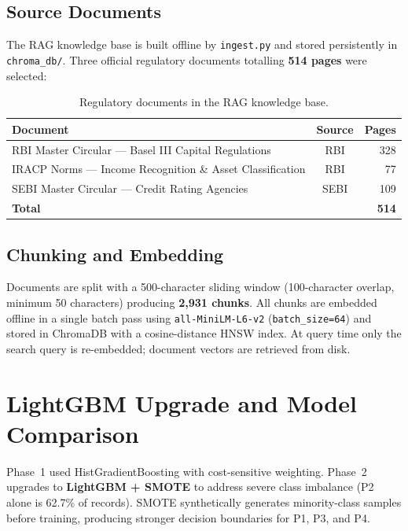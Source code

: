 \documentclass[11pt,a4paper]{article}
\begin{document}
\subsection{Source Documents}

The RAG knowledge base is built offline by \texttt{ingest.py} and stored persistently in \texttt{chroma\_db/}. Three official regulatory documents totalling \textbf{514 pages} were selected:

\begin{table}[h!]
    \centering
    \small
    \renewcommand{\arraystretch}{1.45}
    \begin{tabularx}{\textwidth}{@{} X c r @{}}
        \toprule
        \textbf{Document} & \textbf{Source} & \textbf{Pages} \\
        \midrule
        RBI Master Circular --- Basel III Capital Regulations     & RBI  & 328 \\
        IRACP Norms --- Income Recognition \& Asset Classification & RBI  & 77  \\
        SEBI Master Circular --- Credit Rating Agencies           & SEBI & 109 \\
        \midrule
        \textbf{Total} & & \textbf{514} \\
        \bottomrule
    \end{tabularx}
    \caption{Regulatory documents in the RAG knowledge base.}
    \label{tab:rag_docs}
\end{table}

\subsection{Chunking and Embedding}

Documents are split with a 500-character sliding window (100-character overlap, minimum 50 characters) producing \textbf{2,931 chunks}. All chunks are embedded offline in a single batch pass using \texttt{all-MiniLM-L6-v2} (\texttt{batch\_size=64}) and stored in ChromaDB with a cosine-distance HNSW index. At query time only the search query is re-embedded; document vectors are retrieved from disk.

\section{LightGBM Upgrade and Model Comparison}

Phase~1 used HistGradientBoosting with cost-sensitive weighting. Phase~2 upgrades to \textbf{LightGBM + SMOTE} to address severe class imbalance (P2 alone is 62.7\% of records). SMOTE synthetically generates minority-class samples before training, producing stronger decision boundaries for P1, P3, and P4.
\end{document}
